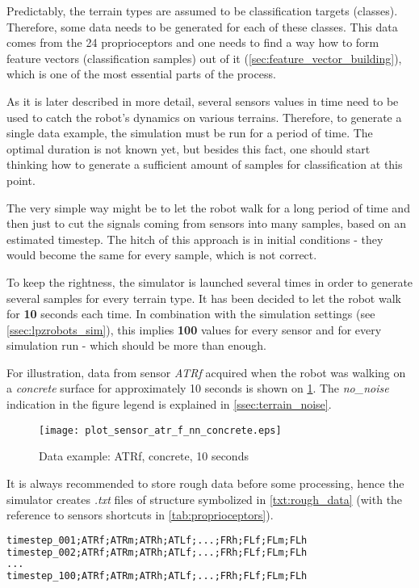 Predictably, the terrain types are assumed to be classification targets (classes). Therefore, some data needs to be generated for each of these classes. This data comes from the 24 proprioceptors and one needs to find a way how to form feature vectors (classification samples) out of it (\cref{sec:feature_vector_building}), which is one of the most essential parts of the process.

As it is later described in more detail, several sensors values in time need to be used to catch the robot's dynamics on various terrains. Therefore, to generate a single data example, the simulation must be run for a period of time. The optimal duration is not known yet, but besides this fact, one should start thinking how to generate a sufficient amount of samples for classification at this point.

The very simple way might be to let the robot walk for a long period of time and then just to cut the signals coming from sensors into many samples, based on an estimated timestep. The hitch of this approach is in initial conditions - they would become the same for every sample, which is not correct.

To keep the rightness, the simulator is launched several times in order to generate several samples for every terrain type. It has been decided to let the robot walk for \textbf{10} seconds each time. In combination with the simulation settings (see \cref{ssec:lpzrobots_sim}), this implies \textbf{100} values for every sensor and for every simulation run - which should be more than enough.

For illustration, data from sensor \textit{ATRf} acquired when the robot was walking on a \textit{concrete} surface for approximately 10 seconds is shown on \cref{fig:data_example}. The \textit{no\_noise} indication in the figure legend is explained in \cref{ssec:terrain_noise}.

\begin{figure}[H]
  \centering
  \texttt{[image: plot\_sensor\_atr\_f\_nn\_concrete.eps]}
  \caption{Data example: ATRf, concrete, 10 seconds}
  \label{fig:data_example}
\end{figure}

It is always recommended to store rough data before some processing, hence the simulator creates \textit{.txt} files of structure symbolized in \cref{txt:rough_data} (with the reference to sensors shortcuts in \cref{tab:proprioceptors}). 

\begin{lstlisting}[language=XML, caption={Rough sensory data files structure}, label=txt:rough_data]
timestep_001;ATRf;ATRm;ATRh;ATLf;...;FRh;FLf;FLm;FLh
timestep_002;ATRf;ATRm;ATRh;ATLf;...;FRh;FLf;FLm;FLh
...
timestep_100;ATRf;ATRm;ATRh;ATLf;...;FRh;FLf;FLm;FLh
\end{lstlisting}

